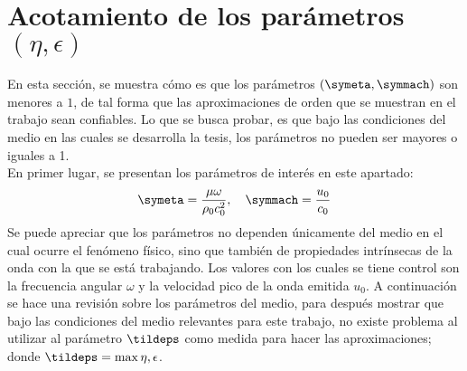 \chapter{Acotamiento de los parámetros $(\eta, \epsilon)$}\label{app3}

En esta sección, se muestra cómo es que los parámetros $(\symeta, \symmach)$ son menores a $1$, de tal forma que las aproximaciones de orden que se muestran en el trabajo sean confiables. Lo que se busca probar, es que bajo las condiciones del medio en las cuales se desarrolla la tesis, los parámetros no pueden ser mayores o iguales a 1.\medskip\\
En primer lugar, se presentan los parámetros de interés en este apartado:
\begin{equation}
\symeta = \frac{\mu \omega}{\rho_0c_0^2} ,\quad \symmach = \frac{u_0}{c_0}
\end{equation}
Se puede apreciar que los parámetros no dependen únicamente del medio en el cual ocurre el fenómeno físico, sino que también de propiedades intrínsecas de la onda con la que se está trabajando. Los valores con los cuales se tiene control son la frecuencia angular $\omega$ y la velocidad pico de la onda emitida $u_0$. A continuación se hace una revisión sobre los parámetros del medio, para después mostrar que bajo las condiciones del medio relevantes para este trabajo, no existe problema al utilizar al parámetro $\tildeps$ como medida para hacer las aproximaciones; donde $\tildeps = \max{\eta,\epsilon}$.

